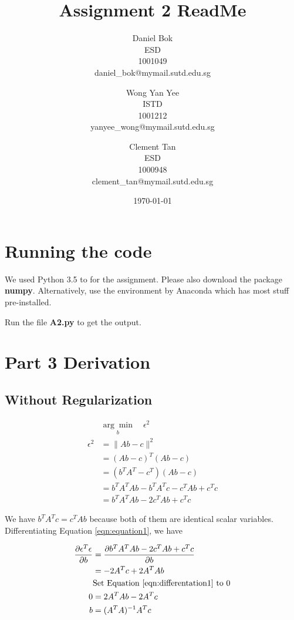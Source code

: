 \documentclass[]{article}
\title{Assignment 2 ReadMe}
\author{
	Daniel Bok \\
	ESD \\
	1001049 \\
	daniel\_bok@mymail.sutd.edu.sg 
	\and
	Wong Yan Yee\\ 
	ISTD \\
	1001212 \\
	yanyee\_wong@mymail.sutd.edu.sg
	\and
	Clement Tan \\
	ESD \\
	1000948 \\
	clement\_tan@mymail.sutd.edu.sg
}
\date{\today}
\begin{document}
	
\maketitle

\section{Running the code}

We used Python 3.5 to for the assignment. Please also download the package \textbf{numpy}. Alternatively, use the environment by Anaconda which has most stuff pre-installed.

Run the file \textbf{A2.py} to get the output.


\newpage
\section{Part 3 Derivation}

\subsection{Without Regularization}

\begin{align}
&\underset{b}{\arg\min} \quad \epsilon^2 \nonumber \\
\epsilon^2 &= \| Ab - c \|^2 \nonumber \\
&= (Ab - c)^T(Ab - c) \nonumber \\
&= (b^TA^T - c^T)(Ab - c) \nonumber \\
&= b^TA^TAb - b^TA^Tc - c^TAb + c^Tc \nonumber \\
&= b^TA^TAb - 2c^TAb + c^Tc \label{eqn:equation1}
\end{align}

We have  $b^TA^Tc = c^TAb$ because both of them are identical scalar variables. Differentiating Equation \ref{eqn:equation1}, we have

\begin{align}
\frac{\partial \epsilon^T\epsilon}{\partial b} 
	&= \frac{\partial b^TA^TAb - 2c^TAb + c^Tc}{\partial b} \nonumber \\
&= -2A^Tc + 2A^TAb \label{eqn:differentation1}\\
&\text{Set Equation \ref{eqn:differentation1} to 0} \nonumber \\ 
0 &= 2A^TAb - 2A^Tc \nonumber \\
b &= (A^TA)^{-1}A^Tc
\end{align}
\end{document}
